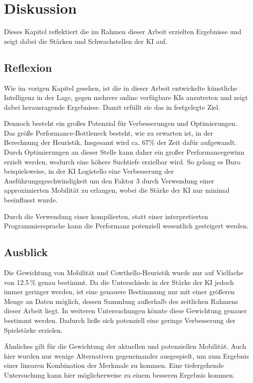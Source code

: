 
\chapter{Diskussion}
\label{chap:diskussion}
Dieses Kapitel reflektiert die im Rahmen dieser Arbeit erzielten Ergebnisse und zeigt dabei die Stärken und
Schwachstellen der KI auf.

\section{Reflexion}
Wie im vorigen Kapitel gesehen, ist die in dieser Arbeit entwickelte künstliche Intelligenz in der Lage, gegen mehrere
online verfügbare KIs anzutreten und zeigt dabei herausragende Ergebnisse. Damit erfüllt sie das in \label{sec:goal}
festgelegte Ziel.

Dennoch besteht ein großes Potenzial für Verbesserungen und Optimierungen. Das größe Performance-Bottleneck besteht, wie
zu erwarten ist, in der Berechnung der Heuristik. Insgesamt wird ca. \(67\%\) der Zeit dafür aufgewandt. Durch
Optimierungen an dieser Stelle kann daher ein großer Performancegewinn erzielt werden, wodurch eine höhere Suchtiefe
erzielbar wird. So gelang es Buro beispielsweise, in der KI Logistello eine Verbesserung der Ausführungsgeschwindigkeit
um den Faktor 3 durch Verwendung einer approximierten Mobilität zu erlangen, wobei die Stärke der KI nur minimal
beeinflusst wurde. \cite[S.~8]{evaluationfunctions}

Durch die Verwendung einer kompilierten, statt einer interpretierten Programmiersprache kann die Performanz potenziell
wesentlich gesteigert werden.


\section{Ausblick}
Die Gewichtung von Mobilität und Cowthello-Heuristik wurde nur auf Vielfache von 12.5\,\% genau bestimmt. Da die
Unterschiede in der Stärke der KI jedoch immer geringer werden, ist eine genauere Bestimmung nur mit einer größeren
Menge an Daten möglich, dessen Sammlung außerhalb des zeitlichen Rahmens dieser Arbeit liegt. In weiteren Untersuchungen
könnte diese Gewichtung genauer bestimmt werden. Dadurch ließe sich potenziell eine geringe Verbesserung der Spielstärke
erzielen.

Ähnliches gilt für die Gewichtung der aktuellen und potenziellen Mobilität. Auch hier wurden nur wenige Alternativen
gegeneinander ausgespielt, um zum Ergebnis einer linearen Kombination der Merkmale zu kommen. Eine tiefergehende
Untersuchung kann hier möglicherweise zu einem besseren Ergebnis kommen.